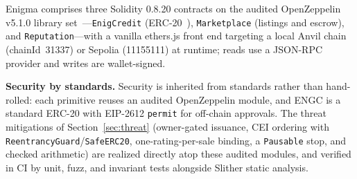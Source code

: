 Enigma comprises three Solidity 0.8.20 contracts on the audited OpenZeppelin v5.1.0 library set~\cite{openzeppelin}---\texttt{EnigCredit} (ERC-20~\cite{eip20}), \texttt{Marketplace} (listings and escrow), and \texttt{Reputation}---with a vanilla ethers.js front end targeting a local Anvil chain (chainId~31337) or Sepolia (11155111) at runtime; reads use a JSON-RPC provider and writes are wallet-signed.

\textbf{Security by standards.} Security is inherited from standards rather than hand-rolled: each primitive reuses an audited OpenZeppelin module, and ENGC is a standard ERC-20 with EIP-2612 \texttt{permit} for off-chain approvals. The threat mitigations of Section~\ref{sec:threat} (owner-gated issuance, CEI ordering with \texttt{ReentrancyGuard}/\texttt{SafeERC20}, one-rating-per-sale binding, a \texttt{Pausable} stop, and checked arithmetic) are realized directly atop these audited modules, and verified in CI by unit, fuzz, and invariant tests alongside Slither static analysis.
